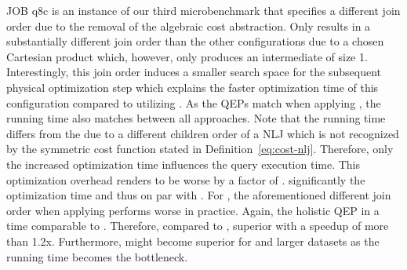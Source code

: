 
JOB q8c is an instance of our third microbenchmark that specifies a different join order due to the removal of the algebraic cost abstraction.  Only \split{}  \PEall results in a substantially different join order than the other  configurations due to a chosen Cartesian product which, however, only produces an intermediate of size 1.  Interestingly, this join order induces a smaller search space for the subsequent physical optimization step which explains the faster optimization time of this configuration compared to \split utilizing \DPccp{} .  As the QEPs match when applying \DPccp{} , the running time also matches between all approaches.  Note that the running time  differs from the  due to a different children order of a NLJ which is not recognized by the symmetric cost function stated in Definition~\ref{eq:cost-nlj}.  Therefore, only the increased optimization time influences the  query execution time.  This optimization overhead renders \holistic to be worse by a factor of .    significantly  the optimization time and thus  on par with \split.  For \PEall, the aforementioned different join order when applying \split performs worse in practice.  Again,    the holistic QEP in a time comparable to \split.  Therefore, compared to \split,   superior with a speedup of more than 1.2x.  Furthermore,  \holistic might become superior for \PEall and larger datasets as the running time becomes the bottleneck.

